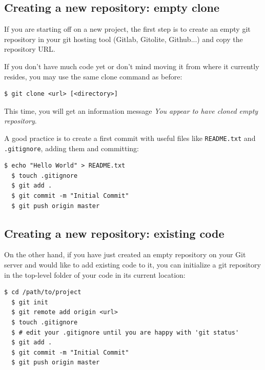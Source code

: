 \documentclass[a4paper]{../../common/tufte-latex/tufte-handout}
\begin{document}
\subsection{Creating a new repository: empty clone}

If you are starting off on a new project, the first step is to create an empty git repository in your git hosting tool (Gitlab, Gitolite, Github...) and copy the repository URL.

If you don't have much code yet or don't mind moving it from where it currently resides, you may use the same clone command as before:

\begin{lstlisting}[style=BashInputStyle]
  $ git clone <url> [<directory>]
\end{lstlisting}

This time, you will get an information message \textit{You appear to have cloned empty repository}.

A good practice is to create a first commit with useful files like \texttt{README.txt} and \texttt{.gitignore}, adding them and committing: 

\begin{lstlisting}[style=BashInputStyle]
  $ echo "Hello World" > README.txt
  $ touch .gitignore
  $ git add .
  $ git commit -m "Initial Commit"
  $ git push origin master
\end{lstlisting}

\subsection{Creating a new repository: existing code}

On the other hand, if you have just created an empty repository on your Git server and would like to add existing code to it, you can initialize a git repository in the top-level folder of your code in its current location: 

\begin{lstlisting}[style=BashInputStyle]
  $ cd /path/to/project
  $ git init
  $ git remote add origin <url>
  $ touch .gitignore
  $ # edit your .gitignore until you are happy with 'git status'
  $ git add .
  $ git commit -m "Initial Commit"
  $ git push origin master
\end{lstlisting} 
\end{document}

